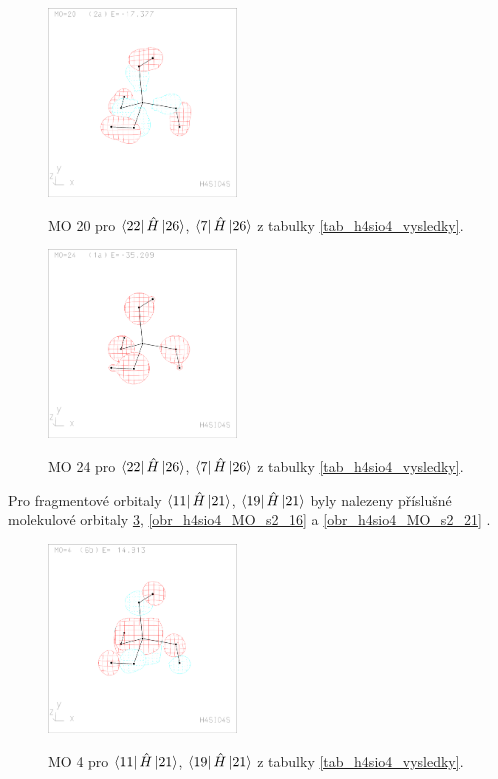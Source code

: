 \documentclass[
  digital, %
  table,   %
  lof,     %
  lot,     %
]{fithesis3}
\begin{document}
\begin{figure}[h]
\caption{MO 20 pro $\bra{22}{\hat{H}}\ket{26}$, $\bra{7}{\hat{H}}\ket{26}$ z tabulky \ref{tab_h4sio4_vysledky}.  }
  \center
  \includegraphics[width=5cm]{h4sio4_obrazky/s1_20.eps}
  \label{obr_h4sio4_MO_s1_20}
  \end{figure}

\begin{figure}[h]
\caption{MO 24 pro $\bra{22}{\hat{H}}\ket{26}$, $\bra{7}{\hat{H}}\ket{26}$ z tabulky \ref{tab_h4sio4_vysledky}.  }
  \center
  \includegraphics[width=5cm]{h4sio4_obrazky/s1_24.eps}
  \label{obr_h4sio4_MO_s1_24}
  \end{figure}
  
  Pro fragmentové orbitaly $\bra{11}{\hat{H}}\ket{21}$, $\bra{19}{\hat{H}}\ket{21}$ byly nalezeny příslušné molekulové orbitaly \ref{obr_h4sio4_MO_s2_4}, \ref{obr_h4sio4_MO_s2_16} a \ref{obr_h4sio4_MO_s2_21} .
  
  \begin{figure}[h]
\caption{MO 4 pro $\bra{11}{\hat{H}}\ket{21}$, $\bra{19}{\hat{H}}\ket{21}$ z tabulky \ref{tab_h4sio4_vysledky}.  }
  \center
  \includegraphics[width=5cm]{h4sio4_obrazky/s2_4.eps}
  \label{obr_h4sio4_MO_s2_4}
  \end{figure}
\end{document}
